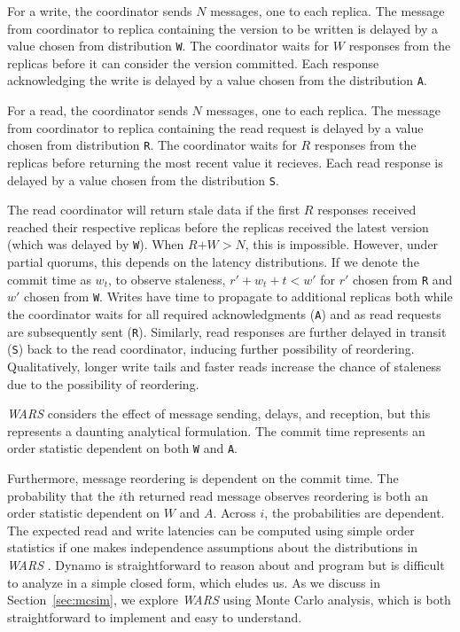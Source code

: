 \documentclass{vldb}
\begin{document}
For a write, the coordinator sends $N$ messages, one to each
replica. The message from coordinator to replica containing the
version to be written is delayed by a value chosen from distribution
\texttt{W}.  The coordinator waits for $W$ responses from the replicas
before it can consider the version committed.  Each response
acknowledging the write is delayed by a value chosen from the
distribution \texttt{A}.

For a read, the coordinator sends $N$ messages, one to each replica.
The message from coordinator to replica containing the read request is
delayed by a value chosen from distribution \texttt{R}.  The
coordinator waits for $R$ responses from the replicas before returning
the most recent value it recieves.  Each read response is delayed by a
value chosen from the distribution \texttt{S}.

The read coordinator will return stale data if the first $R$ responses
received reached their respective replicas before the replicas
received the latest version (which was delayed by \texttt{W}).  When
$R$$+$$W$$>$$N$, this is impossible.  However, under partial quorums,
this depends on the latency distributions.  If we denote the commit
time as $w_t$, to observe staleness, $r'+w_t+t< w'$ for $r'$ chosen
from \texttt{R} and $w'$ chosen from \texttt{W}.  Writes have time to
propagate to additional replicas both while the coordinator waits for
all required acknowledgments (\texttt{A}) and as read requests are
subsequently sent (\texttt{R}).  Similarly, read responses are further
delayed in transit (\texttt{S}) back to the read coordinator, inducing
further possibility of reordering.  Qualitatively, longer write tails
and faster reads increase the chance of staleness due to the
possibility of reordering.

\textit{WARS} considers the effect of message sending, delays, and
reception, but this represents a daunting analytical formulation.  The
commit time represents an order statistic dependent on both \texttt{W}
and \texttt{A}.  Furthermore, message reordering is
dependent on the commit time.  The probability that the $i$th returned
read message observes reordering is both an order statistic dependent
on $W$ and $A$.  Across $i$, the probabilities are dependent.  The
expected read and write latencies can be computed using simple order
statistics if one makes independence assumptions about the
distributions in \textit{WARS} .  Dynamo is straightforward to reason
about and program but is difficult to analyze in a simple closed form,
which eludes us.  As we discuss in Section~\ref{sec:mcsim}, we explore
\textit{WARS} using Monte Carlo analysis, which is both
straightforward to implement and easy to understand.
\end{document}
